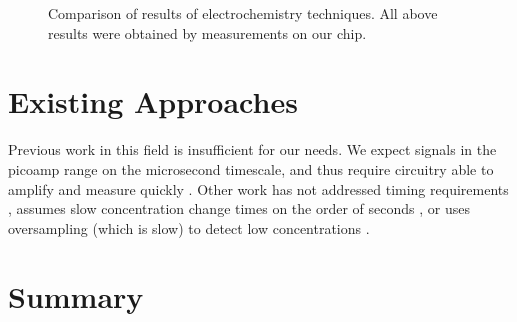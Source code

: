 \begin{figure}
	\centering
	\caption[Comparison of results of electrochemistry techniques]{Comparison of results of electrochemistry techniques. All above results were obtained by measurements on our chip.}
\end{figure}

\section{Existing Approaches}

Previous work in this field is insufficient for our needs. We expect signals in the picoamp range on the microsecond timescale, and thus require circuitry able to amplify and measure quickly \cite{mosharok2005aee}. Other work has not addressed timing requirements \cite{zhang2005eam} \cite{steffan2007scp}, assumes slow concentration change times on the order of seconds \cite{murari2005ipn}, or uses oversampling (which is slow) to detect low concentrations \cite{murari2005ipn} \cite{stanacevic2007vpa}.

\section{Summary}
